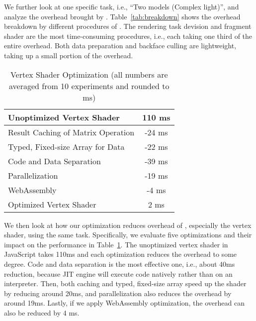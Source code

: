 We further look at one specific task, i.e., ``Two models (Complex light)'', and analyze the overhead brought by \sys.  Table~\ref{tab:breakdown} shows the overhead breakdown by different procedures of \sys. 
 The rendering task devision and fragment shader are the most time-consuming procedures, i.e., each taking one third of the entire overhead.  Both data preparation and backface culling are lightweight, taking up a small portion of the overhead. 



\begin{table}
\footnotesize \centering
\caption{Vertex Shader Optimization (all numbers are averaged from 10 experiments and rounded to ms)} %
 \label{tab:op}
\begin{tabular}{lc}
\toprule
{Unoptimized Vertex Shader} & 110 ms \\
\midrule
Result Caching of Matrix Operation& -24 ms \\
Typed, Fixed-size Array for Data & -22 ms \\
Code and Data Separation & -39 ms\\
Parallelization & -19 ms \\
WebAssembly & -4 ms \\
\midrule
Optimized Vertex Shader &  2 ms\\
\bottomrule
\end{tabular}%
\end{table}

We then look at how our optimization reduces overhead of \sys, especially the vertex shader, using the same task.  Specifically, we evaluate five optimizations and their impact on the performance in Table~\ref{tab:op}. 
%
   The unoptimized vertex shader in JavaScript takes 110ms and each optimization reduces the overhead to some degree.  Code and data separation is the most effective one, i.e., about 40ms reduction, because JIT engine will execute code natively rather than on an interpreter.   Then, both caching and typed, fixed-size array speed up the shader by reducing around 20ms, and %
 parallelization also reduces the overhead by around 19ms. Lastly, if we apply WebAssembly optimization, the overhead can also be reduced by 4 ms. 

